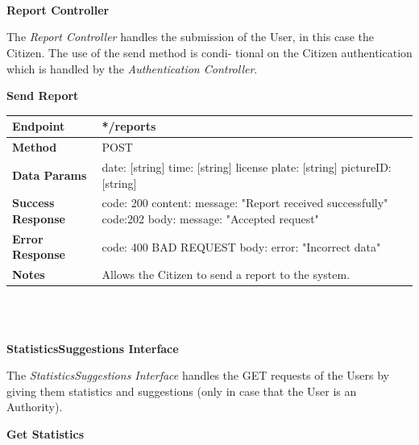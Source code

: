 \documentclass{report}
\begin{document}
\\
\\\\
\begin{center}\large{\textbf{Report Controller}}\end{center}
The \textit{Report Controller} handles the submission of the User, in this case the Citizen. The use of the send method is condi-
tional on the Citizen authentication which is handled by the \textit{Authentication Controller}.\\
\clearpage
\begin{center}{\textbf{Send Report}}\end{center}
    \begin{tabular}{| l | p{8cm} |}
        \hline
        \textbf{Endpoint} & */reports\\
        \hline
        \textbf{Method} & POST \\
        \hline
        \textbf{Data Params} & date: [string] \newline time: [string] \newline license plate: [string] \newline pictureID: [string]\\
        \hline
        \textbf{Success Response} &  code: 200 \newline content: {message: "Report received successfully"} \newline \newline code:202 \newline body: {message: "Accepted request"}\\
        \hline
        \textbf{Error Response} & code: 400 BAD REQUEST \newline body: {error: "Incorrect data"}\\
        \hline
        \textbf{Notes} & Allows the Citizen to send a report to the system. \\
        \hline
    \end{tabular}
\\\\
\begin{center}\large{\textbf{StatisticsSuggestions Interface}}\end{center}
The \textit{StatisticsSuggestions Interface} handles the GET requests of the Users by giving them statistics and suggestions (only in case that the User is an Authority).
\begin{center}{\textbf{Get Statistics}}\end{center}
\end{document}
